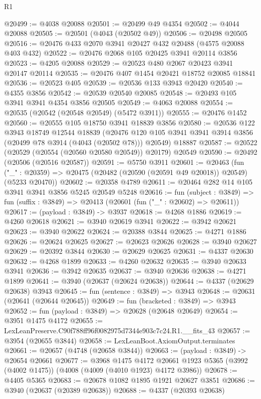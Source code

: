 \begin{lexlean}{R1}
\begin{coremodule}
@20499 := @4038 @20088
@20501 := @20499 @49 @4354
@20502 := @4044 @20088
@20505 := @20501 (@4043 (@20502 @49))
@20506 := @20498 @20505
@20516 := @20476 @433 @2070 @3941 @20427 @432 @20488 (@4575 @20088 @403 @432)
@20522 := @20476 @2068 @105 @20425 @3941 @20114 @3856
@20523 := @4205 @20088
@20529 := @20523 @480 @2067 @20423 @3941 @20147 @20114
@20535 := @20476 @407 @1454 @20421 @18752 @20085 @18841
@20536 := @20523 @405
@20539 := @20536 @133 @3943 @20420
@20540 := @4355 @3856
@20542 := @20539 @20540 @20085
@20548 := @20493 @105 @3941 @3941 @4354 @3856 @20505
@20549 := @4063 @20088
@20554 := @20535 (@20542 (@20548 @20549) (@5472 @3911))
@20555 := @20476 @1452
@20560 := @20555 @105 @18750 @3941 @18839 @3856
@20580 := @20536
    @122
    @3943
    @18749
    @12544
    @18839
    (@20476 @120 @105 @3941 @3941 @3914 @3856 (@20499 @78 @3914 (@4043 (@20502 @78))) @20549)
    @18887
@20587 := @20522 (@20529 (@20554 (@20560 @20580 @20549)) @20179) @20549
@20590 := @20492 (@20506 (@20516 @20587))
@20591 := @5750 @3911
@20601 := @20463
    (fun ("_" : @20359) => @20475 (@20482 (@20590 (@20591 @49 @20018)) @20549) (@5233 @20470))
@20602 := @20358 @4789
@20611 := @20464 @282 @14 @105 @3941 @3941 @3856 @5245 @20549 @5248
@20616 := fun (subject : @3849) =>
  fun (suffix : @3849) => @20413 (@20601 (fun ("_" : @20602) => @20611))
@20617 := (payload : @3849) -> @3937
@20618 := @4268 @1886
@20619 := @4260 @20618
@20621 := @3940 @20619 @3941
@20622 := @3942 @20621
@20623 := @3940 @20622
@20624 := @20388 @3844
@20625 := @4271 @1886
@20626 := @20624 @20625
@20627 := @20623 @20626
@20628 := @3940 @20627
@20629 := @20392 @3844
@20630 := @20629 @20625
@20631 := @4337 @20630
@20632 := @4268 @1899
@20633 := @4260 @20632
@20635 := @3940 @20633 @3941
@20636 := @3942 @20635
@20637 := @3940 @20636
@20638 := @4271 @1899
@20641 := @3940 (@20637 (@20624 @20638))
@20644 := @4337 (@20629 @20638) @3943
@20645 := fun (sentence : @3849) => @3943
@20648 := @20631 (@20641 (@20644 @20645))
@20649 := fun (bracketed : @3849) => @3943
@20652 := fun (payload : @3849) => @20628 (@20648 @20649)
@20654 := @3951 @1475 @4172
@20655 := LexLeanPreserve.C90f788ff96f0082975d7344e903c7c24.R1.__fits_43
@20657 := @3954 (@20655 @3844)
@20658 := LexLeanBoot.AxiomOutput.terminates
@20661 := @20657 (@4748 (@20658 @3844))
@20663 := (payload : @3849) -> @20654 @20661
@20677 := @3968
    @1475
    @4172
    @20661
    @1923
    @5365
    (@3992 (@4002 @1475))
    (@4008 (@4009 (@4010 @1923) @4172 @3986))
@20678 := @4405 @5365
@20683 := @20678 @1082 @1895 @1921 @20627 @3851
@20686 := @3940 (@20637 (@20389 @20638))
@20688 := @4337 (@20393 @20638)

\end{coremodule}
\end{lexlean}
